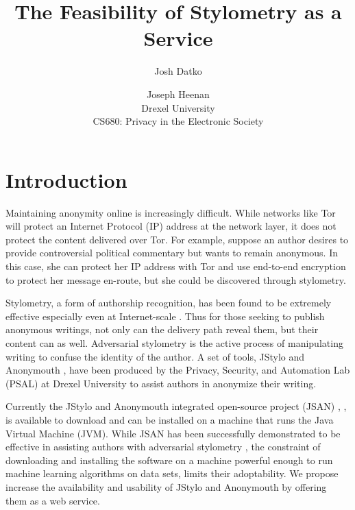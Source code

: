 \documentclass[letterpaper]{article}
\begin{document}
\setcounter{secnumdepth}{1}
\title{The Feasibility of Stylometry as a Service}
\author{Josh Datko \and Joseph Heenan\\ Drexel University\\
CS680: Privacy in the Electronic Society\\
}
\maketitle

\section*{Introduction}\label{sec:intro}


Maintaining anonymity online is increasingly difficult.  While
networks like Tor \cite{Dingledine04tor:the} will protect an Internet
Protocol (IP) address at the network layer, it does not protect the
content delivered over Tor.  For example, suppose an author desires to
provide controversial political commentary but wants to remain
anonymous.  In this case, she can protect her IP address with Tor and
use end-to-end encryption to protect her message en-route, but she
could be discovered through stylometry.

Stylometry, a form of authorship recognition, has been found to be
extremely effective especially even at
Internet-scale \cite{Narayanan:2012:FIA:2310656.2310687}.  Thus for
those seeking to publish anonymous writings, not only can the delivery
path reveal them, but their content can as well.  Adversarial
stylometry is the active process of manipulating writing to confuse
the identity of the author.  A set of tools, JStylo and
Anonymouth \cite{conf/pet/McDonaldACSG12}, have been produced by the
Privacy, Security, and Automation Lab (PSAL) at Drexel University to
assist authors in anonymize their writing.

Currently the JStylo and Anonymouth integrated open-source project
(JSAN) \cite{BrennanG09}, \cite{journals/tissec/BrennanAG12},
\cite{conf/pet/McDonaldACSG12} is available to download and can be installed on a machine that
runs the Java Virtual Machine (JVM).  While JSAN has been successfully
demonstrated to be effective in assisting authors with adversarial
stylometry \cite{journals/tissec/BrennanAG12}, the constraint of
downloading and installing the software on a machine powerful enough
to run machine learning algorithms on data sets, limits their
adoptability.  We propose increase the availability and usability of
JStylo and Anonymouth by offering them as a web service.
\end{document}
